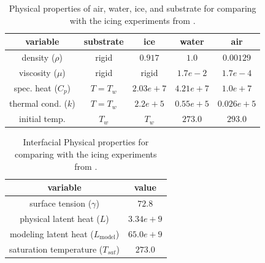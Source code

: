 \documentclass[]{article}
\begin{document}
\begin{table}[h!]
\caption{Physical properties of air, water, ice, and substrate for comparing 
	with the icing experiments from \cite{hu2010icing}.  
}
 \centering
\begin{tabular}{|c|c|c|c|c|}
\hline
variable             & substrate & ice       & water     & air\\ \hline
density ($\rho$)     & rigid     & $0.917$   & $1.0$     & $0.00129$ \\ \hline
viscosity ($\mu$)    & rigid     & rigid     & $1.7e-2$  & $1.7e-4$ \\ \hline
spec. heat ($C_{p}$) & $T=T_{w}$ & $2.03e+7$ & $4.21e+7$ & $1.0e+7$ \\ \hline
thermal cond. ($k$)  & $T=T_{w}$ & $2.2e+5$  & $0.55e+5$ & $0.026e+5$ \\ \hline
initial temp.        & $T_{w}$   & $T_{w}$   & $273.0$   & $293.0$ \\ \hline
\end{tabular}
\label{paramtable}
\end{table}

\begin{table}[h!]
\caption{Interfacial Physical properties for comparing 
	with the icing experiments from \cite{hu2010icing}.  
}
\centering
\begin{tabular}{|c|c|}
\hline
variable                                & value \\ \hline
surface tension ($\gamma$)              & $72.8$ \\ \hline
physical latent heat ($L$) & $3.34e+9$ \\ \hline
modeling latent heat ($L_{\mbox{model}}$) & $65.0e+9$ \\ \hline
saturation temperature ($T_{sat}$) & $273.0$ \\ \hline
\end{tabular}
\label{paramtable_int}
\end{table}
\end{document}
